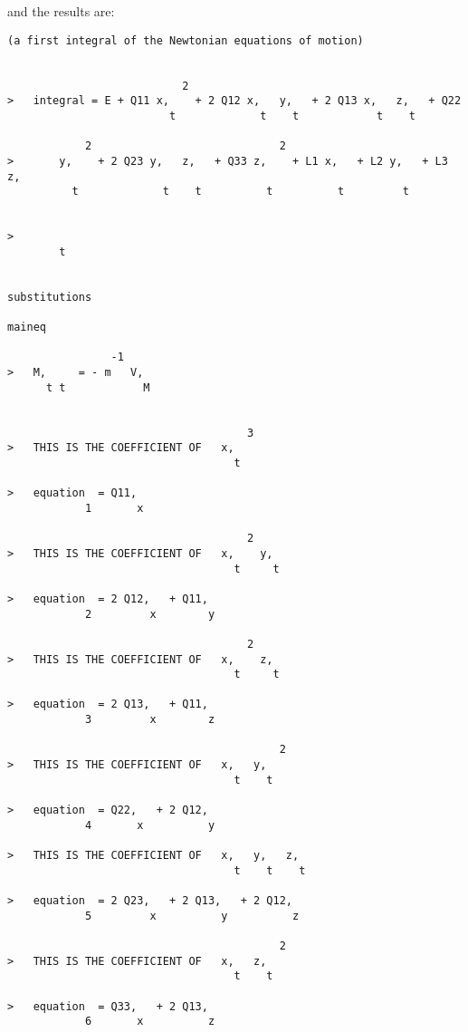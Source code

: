 \bigskip

\noindent and the results are:

\bigskip

\begin{verbatim}
(a first integral of the Newtonian equations of motion)


                           2
>   integral = E + Q11 x,    + 2 Q12 x,   y,   + 2 Q13 x,   z,   + Q22
                         t             t    t            t    t

            2                             2
>       y,    + 2 Q23 y,   z,   + Q33 z,    + L1 x,   + L2 y,   + L3 z,
          t             t    t          t          t         t


>
        t


substitutions

maineq

                -1
>   M,     = - m   V,
      t t            M


                                     3
>   THIS IS THE COEFFICIENT OF   x,
                                   t

>   equation  = Q11,
            1       x

                                     2
>   THIS IS THE COEFFICIENT OF   x,    y,
                                   t     t

>   equation  = 2 Q12,   + Q11,
            2         x        y

                                     2
>   THIS IS THE COEFFICIENT OF   x,    z,
                                   t     t

>   equation  = 2 Q13,   + Q11,
            3         x        z

                                          2
>   THIS IS THE COEFFICIENT OF   x,   y,
                                   t    t

>   equation  = Q22,   + 2 Q12,
            4       x          y

>   THIS IS THE COEFFICIENT OF   x,   y,   z,
                                   t    t    t

>   equation  = 2 Q23,   + 2 Q13,   + 2 Q12,
            5         x          y          z

                                          2
>   THIS IS THE COEFFICIENT OF   x,   z,
                                   t    t

>   equation  = Q33,   + 2 Q13,
            6       x          z


\end{verbatim}
